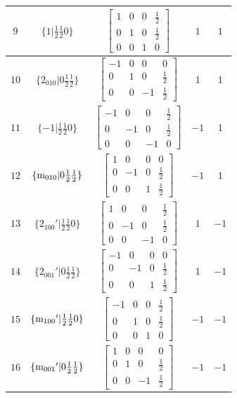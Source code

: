 \documentclass[fleqn,8pt]{jsarticle}
\begin{document}
\begin{longtable}{ccccc}
$ 9 $ & $ \{1|\frac{1}{2} \frac{1}{2} 0\} $ & $ \begin{bmatrix} 1 & 0 & 0 & \frac{1}{2} \\ 0 & 1 & 0 & \frac{1}{2} \\ 0 & 0 & 1 & 0 \end{bmatrix} $ & $ 1 $ & $ 1 $ \\ \hline
$ 10 $ & $ \{2{}_{010}|0 \frac{1}{2} \frac{1}{2}\} $ & $ \begin{bmatrix} -1 & 0 & 0 & 0 \\ 0 & 1 & 0 & \frac{1}{2} \\ 0 & 0 & -1 & \frac{1}{2} \end{bmatrix} $ & $ 1 $ & $ 1 $ \\ \hline
$ 11 $ & $ \{-1|\frac{1}{2} \frac{1}{2} 0\} $ & $ \begin{bmatrix} -1 & 0 & 0 & \frac{1}{2} \\ 0 & -1 & 0 & \frac{1}{2} \\ 0 & 0 & -1 & 0 \end{bmatrix} $ & $ -1 $ & $ 1 $ \\ \hline
$ 12 $ & $ \{{\rm m}_{010}|0 \frac{1}{2} \frac{1}{2}\} $ & $ \begin{bmatrix} 1 & 0 & 0 & 0 \\ 0 & -1 & 0 & \frac{1}{2} \\ 0 & 0 & 1 & \frac{1}{2} \end{bmatrix} $ & $ -1 $ & $ 1 $ \\ \hline
$ 13 $ & $ \{2{}_{100}{}'|\frac{1}{2} \frac{1}{2} 0\} $ & $ \begin{bmatrix} 1 & 0 & 0 & \frac{1}{2} \\ 0 & -1 & 0 & \frac{1}{2} \\ 0 & 0 & -1 & 0 \end{bmatrix} $ & $ 1 $ & $ -1 $ \\ \hline
$ 14 $ & $ \{2{}_{001}{}'|0 \frac{1}{2} \frac{1}{2}\} $ & $ \begin{bmatrix} -1 & 0 & 0 & 0 \\ 0 & -1 & 0 & \frac{1}{2} \\ 0 & 0 & 1 & \frac{1}{2} \end{bmatrix} $ & $ 1 $ & $ -1 $ \\ \hline
$ 15 $ & $ \{{\rm m}_{100}{}'|\frac{1}{2} \frac{1}{2} 0\} $ & $ \begin{bmatrix} -1 & 0 & 0 & \frac{1}{2} \\ 0 & 1 & 0 & \frac{1}{2} \\ 0 & 0 & 1 & 0 \end{bmatrix} $ & $ -1 $ & $ -1 $ \\ \hline
$ 16 $ & $ \{{\rm m}_{001}{}'|0 \frac{1}{2} \frac{1}{2}\} $ & $ \begin{bmatrix} 1 & 0 & 0 & 0 \\ 0 & 1 & 0 & \frac{1}{2} \\ 0 & 0 & -1 & \frac{1}{2} \end{bmatrix} $ & $ -1 $ & $ -1 $ \\
\end{longtable}
\end{document}
